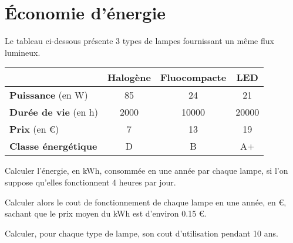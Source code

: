 \section{\'Economie d'énergie}

Le tableau ci-dessous présente 3 types de lampes fournissant un même flux lumineux.
\begin{center}
	
\begin{tabular}{|@{\ }l@{\ }|@{\ }c@{\ }|@{\ }c@{\ }|@{\ }c@{\ }|}
	\hline
	& \textbf{Halogène} & \textbf{Fluocompacte} & \textbf{LED}   \\ \hline
	\textbf{Puissance} (en W)    & 85                & 24                    & 21             \\ \hline
	\textbf{Durée de vie} (en h) & \num{2000}        & \num{10000}           & \num{20000} \\ \hline
	\textbf{Prix} (en €)         & 7                 & 13                    & 19             \\ \hline
	\textbf{Classe énergétique}  & D                 & B                     & A+             \\ \hline
\end{tabular}
\end{center}

\begin{questions}
	\question Calculer l'énergie, en kWh, consommée en une année par chaque lampe, si l'on suppose qu'elles fonctionnent 4 heures par jour.
	
	\fillwithdottedlines{5cm}
	
	\question Calculer alors le cout de fonctionnement de chaque lampe en une année, en €, sachant que le prix moyen du  kWh est d'environ \num{0.15} €.
	\fillwithdottedlines{5cm}
	
	\question Calculer, pour chaque type de lampe, son cout d'utilisation pendant 10 ans.
	
	\fillwithdottedlines{5cm}
\end{questions}